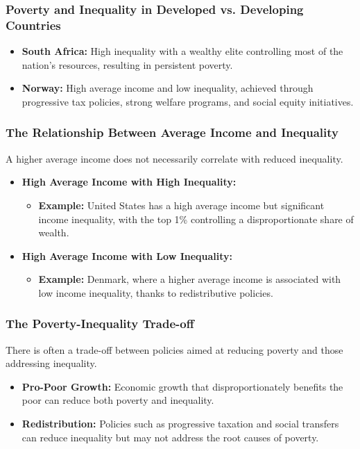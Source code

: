 \documentclass{beamer}
\begin{document}
\begin{frame}
\frametitle{Poverty and Inequality in Developed vs. Developing Countries}
\begin{itemize}
    \item \textbf{South Africa:} High inequality with a wealthy elite controlling most of the nation's resources, resulting in persistent poverty.
    \item \textbf{Norway:} High average income and low inequality, achieved through progressive tax policies, strong welfare programs, and social equity initiatives.
\end{itemize}
\end{frame}

\begin{frame}
\frametitle{The Relationship Between Average Income and Inequality}
A higher average income does not necessarily correlate with reduced inequality.
\begin{itemize}
    \item \textbf{High Average Income with High Inequality:} 
    \begin{itemize}
        \item \textbf{Example:} United States has a high average income but significant income inequality, with the top 1\% controlling a disproportionate share of wealth.
    \end{itemize}
    \item \textbf{High Average Income with Low Inequality:} 
    \begin{itemize}
        \item \textbf{Example:} Denmark, where a higher average income is associated with low income inequality, thanks to redistributive policies.
    \end{itemize}
\end{itemize}
\end{frame}

\begin{frame}
\frametitle{The Poverty-Inequality Trade-off}
There is often a trade-off between policies aimed at reducing poverty and those addressing inequality.
\begin{itemize}
    \item \textbf{Pro-Poor Growth:} Economic growth that disproportionately benefits the poor can reduce both poverty and inequality.
    \item \textbf{Redistribution:} Policies such as progressive taxation and social transfers can reduce inequality but may not address the root causes of poverty.
\end{itemize}
\end{frame}
\end{document}
